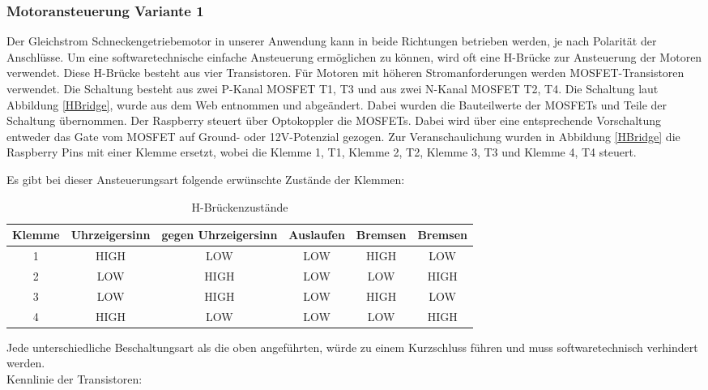 \subsubsection{Motoransteuerung Variante 1}
Der Gleichstrom Schneckengetriebemotor in unserer Anwendung kann in beide Richtungen betrieben werden, je nach Polarität der Anschlüsse. Um eine softwaretechnische einfache Ansteuerung ermöglichen zu können, wird oft eine H-Brücke zur Ansteuerung der Motoren verwendet. Diese H-Brücke besteht aus vier Transistoren. Für Motoren mit höheren Stromanforderungen werden MOSFET-Transistoren verwendet. Die Schaltung besteht aus zwei P-Kanal MOSFET T1, T3 und aus zwei N-Kanal MOSFET T2, T4. Die Schaltung laut Abbildung \ref{HBridge}, wurde aus dem Web entnommen und abgeändert. Dabei wurden die Bauteilwerte der MOSFETs und Teile der Schaltung übernommen. Der Raspberry steuert über Optokoppler die MOSFETs. Dabei wird über eine entsprechende Vorschaltung entweder das Gate vom MOSFET auf Ground- oder 12V-Potenzial gezogen. Zur Veranschaulichung wurden in Abbildung \ref{HBridge} die Raspberry Pins mit einer Klemme ersetzt, wobei die Klemme 1, T1, Klemme 2, T2, Klemme 3, T3 und Klemme 4, T4 steuert. 

Es gibt bei dieser Ansteuerungsart folgende erwünschte Zustände der Klemmen: \\
\begin{table}[htb]
\centering
\begin{tabular}{|c|c|c|c|c|c|} \hline
Klemme & Uhrzeigersinn & gegen Uhrzeigersinn & Auslaufen & Bremsen & Bremsen \\ \hline
1 & HIGH & LOW & LOW & HIGH & LOW  \\ \hline
2 & LOW & HIGH & LOW & LOW & HIGH \\ \hline
3 & LOW & HIGH & LOW & HIGH & LOW \\ \hline
4 & HIGH & LOW & LOW & LOW & HIGH \\ \hline
\end{tabular}
\caption{H-Brückenzustände}
\label{HBridge states}
\end{table}

Jede unterschiedliche Beschaltungsart als die oben angeführten, würde zu einem Kurzschluss führen und muss softwaretechnisch verhindert werden. \\


Kennlinie der Transistoren:

